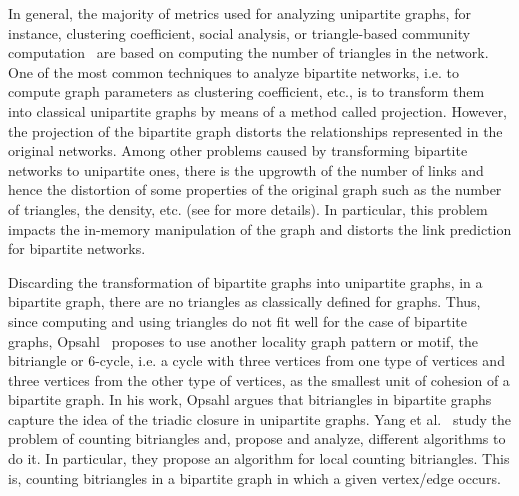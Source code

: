 %
In general, the majority of metrics used for analyzing unipartite graphs, for instance, clustering coefficient, social analysis, or triangle-based community computation~\cite{ccoef,detect_graph,Newman_2003} are based on computing the number of triangles in the network. 
One of the most common techniques to analyze bipartite networks, i.e. to compute graph parameters as clustering coefficient, etc., is to transform them into classical unipartite graphs by means of a method called projection. 
However, the projection of the bipartite graph distorts the relationships represented in the original networks. Among other problems caused by transforming bipartite networks to unipartite ones, there is the upgrowth of the number of links and hence the distortion of some properties of the original graph such as the number of triangles, the density, etc. (see \cite{latapy2008basic} for more details). 
In particular, this problem impacts the in-memory manipulation of the graph and distorts the link prediction for bipartite networks.

Discarding the transformation of bipartite graphs into unipartite graphs, in a bipartite graph, there are no triangles as classically defined for graphs. Thus, since computing and using triangles do not fit well for the case of bipartite graphs, Opsahl~\cite{opsahl} proposes to use another locality graph pattern or motif, the bitriangle or 6-cycle, i.e. a cycle with
three vertices from one type of vertices and three vertices from the other type of vertices, as the smallest unit of cohesion of a bipartite graph. In his work, Opsahl argues that 
bitriangles in bipartite graphs capture the idea of the triadic closure in unipartite graphs. Yang et al.~\cite{btcount}  study the problem of counting bitriangles and, propose and analyze, different algorithms to do it. In particular, they propose an algorithm for local counting bitriangles. 
This is, counting bitriangles in a bipartite graph in which a given vertex/edge occurs.

